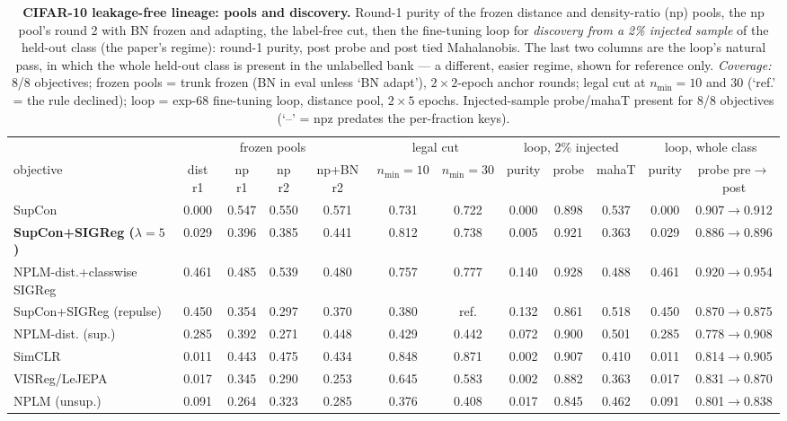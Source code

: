 \begin{landscape}
\begin{table}[p]
\centering
\footnotesize
\setlength{\tabcolsep}{3pt}
\begin{tabular}{lccccccccccc}
\toprule
& \multicolumn{4}{c}{frozen pools} & \multicolumn{2}{c}{legal cut} & \multicolumn{3}{c}{loop, 2\% injected} & \multicolumn{2}{c}{loop, whole class} \\
\cmidrule(lr){2-5}\cmidrule(lr){6-7}\cmidrule(lr){8-10}\cmidrule(lr){11-12}
objective & dist r1 & np r1 & np r2 & np+BN r2 & $n_{\min}{=}10$ & $n_{\min}{=}30$ & purity & probe & mahaT & purity & probe pre$\to$post \\
\midrule
SupCon & 0.000 & 0.547 & 0.550 & 0.571 & 0.731 & 0.722 & 0.000 & 0.898 & 0.537 & 0.000 & 0.907$\to$0.912 \\
\textbf{SupCon+SIGReg ($\lambda{=}5$)} & 0.029 & 0.396 & 0.385 & 0.441 & 0.812 & 0.738 & 0.005 & 0.921 & 0.363 & 0.029 & 0.886$\to$0.896 \\
NPLM-dist.+classwise SIGReg & 0.461 & 0.485 & 0.539 & 0.480 & 0.757 & 0.777 & 0.140 & 0.928 & 0.488 & 0.461 & 0.920$\to$0.954 \\
SupCon+SIGReg (repulse) & 0.450 & 0.354 & 0.297 & 0.370 & 0.380 & ref. & 0.132 & 0.861 & 0.518 & 0.450 & 0.870$\to$0.875 \\
NPLM-dist. (sup.) & 0.285 & 0.392 & 0.271 & 0.448 & 0.429 & 0.442 & 0.072 & 0.900 & 0.501 & 0.285 & 0.778$\to$0.908 \\
SimCLR & 0.011 & 0.443 & 0.475 & 0.434 & 0.848 & 0.871 & 0.002 & 0.907 & 0.410 & 0.011 & 0.814$\to$0.905 \\
VISReg/LeJEPA & 0.017 & 0.345 & 0.290 & 0.253 & 0.645 & 0.583 & 0.002 & 0.882 & 0.363 & 0.017 & 0.831$\to$0.870 \\
NPLM (unsup.) & 0.091 & 0.264 & 0.323 & 0.285 & 0.376 & 0.408 & 0.017 & 0.845 & 0.462 & 0.091 & 0.801$\to$0.838 \\
\bottomrule
\end{tabular}
\caption{\textbf{CIFAR-10 leakage-free lineage: pools and discovery.} Round-1 purity of the frozen distance and density-ratio (np) pools, the np pool's round 2 with BN frozen and adapting, the label-free cut, then the fine-tuning loop for \emph{discovery from a 2\% injected sample} of the held-out class (the paper's regime): round-1 purity, post probe and post tied Mahalanobis. The last two columns are the loop's natural pass, in which the whole held-out class is present in the unlabelled bank --- a different, easier regime, shown for reference only. \emph{Coverage:} 8/8 objectives; frozen pools = trunk frozen (BN in eval unless `BN adapt'), $2\times2$-epoch anchor rounds; legal cut at $n_{\min}=10$ and $30$ (`ref.' = the rule declined); loop = exp-68 fine-tuning loop, distance pool, $2\times5$ epochs. Injected-sample probe/mahaT present for 8/8 objectives (`--' = npz predates the per-fraction keys).}

\end{table}
\end{landscape}
